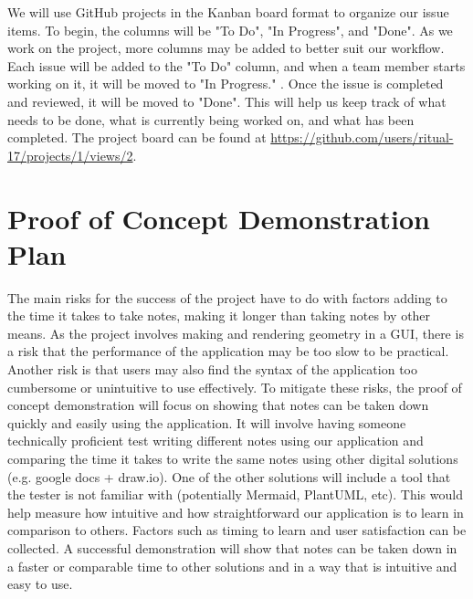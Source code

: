 \documentclass{article}
\begin{document}
  
  We will use GitHub projects in the Kanban board format to organize our 
  issue items. To begin, the columns will be "To Do", "In Progress", 
  and "Done". As we work on the project, more columns may be added to 
  better suit our workflow. Each issue will be added to the "To Do" column,
  and when a team member starts working on it, it will be moved to "In Progress."
  . Once the issue is completed and reviewed, it will be moved to
  "Done". This will help us keep track of what needs to be done, what is 
  currently being worked on, and what has been completed. The project 
  board can be found at 
  \url{https://github.com/users/ritual-17/projects/1/views/2}.
  


\section{Proof of Concept Demonstration Plan}


The main risks for the success of the project have to do with factors adding 
to the time it takes to take notes, making it longer than
taking notes by other means. As the project involves making and rendering 
geometry in a GUI, there is a risk that the performance of the 
application may be too slow to be practical. Another risk is that users may 
also find the syntax of the application too cumbersome or 
unintuitive to use effectively. To mitigate these risks, the proof of concept 
demonstration will focus on showing that notes can be taken 
down quickly and easily using the application. It will involve having someone
technically proficient test writing different notes using our 
application and comparing the time it takes to write the same notes using 
other digital solutions (e.g. google docs + draw.io). One of the other solutions
will include a tool that the tester is not familiar with (potentially Mermaid, 
PlantUML, etc). This would help measure how intuitive and how straightforward
our application is to learn in comparison to others. Factors such as timing to
learn and user satisfaction can be collected. A successful demonstration will
show that notes can be taken down in a faster or comparable time to other
solutions and in a way that is intuitive and easy to use.
\end{document}
